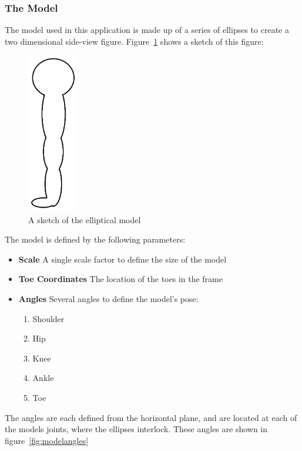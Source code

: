 \subsubsection{The Model}
\label{subsec:model}

The model used in this application is made up of a series of ellipses to create a two dimensional side-view figure. Figure~\ref{fig:modelellipses} shows a sketch of this figure:

\begin{figure}[H]
    \centering
	\includegraphics[height=7cm]{algorithm/images/model}
\caption{A sketch of the elliptical model}
\label{fig:modelellipses}
\end{figure}

The model is defined by the following parameters:

\begin{itemize}
	\item \textbf{Scale} A single scale factor to define the size of the model
	\item \textbf{Toe Coordinates} The location of the toes in the frame
	\item \textbf{Angles} Several angles to define the model's pose:
		\begin{enumerate}
			\item Shoulder
			\item Hip
			\item Knee
			\item Ankle
			\item Toe
		\end{enumerate}
\end{itemize}

The angles are each defined from the horizontal plane, and are located at each of the models joints, where the ellipses interlock. These angles are shown in figure~\ref{fig:modelangles}

